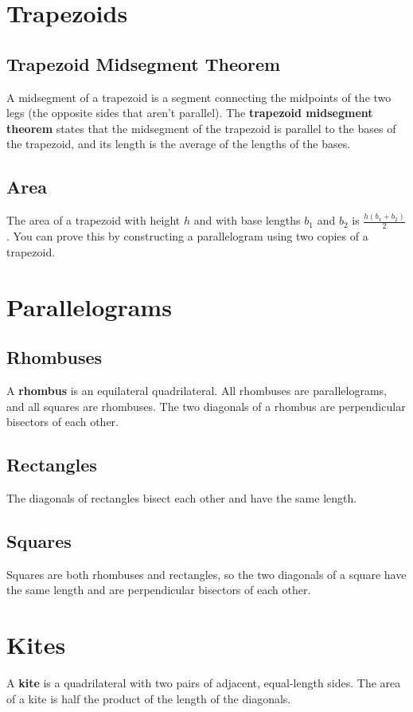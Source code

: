 \documentclass{article}
\begin{document}
\begin{multicols}{2}
	\section*{Trapezoids}
	\subsection*{Trapezoid Midsegment Theorem}
	A midsegment of a trapezoid is a segment connecting the midpoints of the two legs (the opposite sides that aren't parallel).
	The \textbf{trapezoid midsegment theorem} states that the midsegment of the trapezoid is parallel to the bases of the trapezoid, and its length is the average of the lengths of the bases.

	\subsection*{Area}
	The area of a trapezoid with height $h$ and with base lengths $b_1$ and $b_2$ is $\frac{h(b_1 + b_2)}{2}$.
	You can prove this by constructing a parallelogram using two copies of a trapezoid.

	\section*{Parallelograms}
	\subsection*{Rhombuses}
	A \textbf{rhombus} is an equilateral quadrilateral.
	All rhombuses are parallelograms, and all squares are rhombuses.
	The two diagonals of a rhombus are perpendicular bisectors of each other.

	\subsection*{Rectangles}
	The diagonals of rectangles bisect each other and have the same length.

	\subsection*{Squares}
	Squares are both rhombuses and rectangles, so the two diagonals of a square have the same length and are perpendicular bisectors of each other.

	\section*{Kites}
	A \textbf{kite} is a quadrilateral with two pairs of adjacent, equal-length sides.
	The area of a kite is half the product of the length of the diagonals.
\end{multicols}
\end{document}
